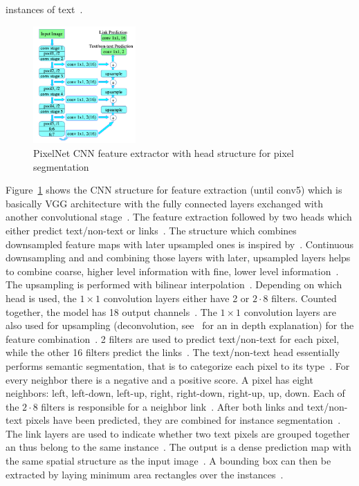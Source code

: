 instances of text~\citep{deng_pixellink_2018}.
\begin{figure}[ht]
    \centering
    \includegraphics[width=0.35\textwidth]{img/STD-seg-based-CNN-Deng-PixelLink-2018.png}
    \caption[Feature extractor and prediction head for pixel segmentation]{%
        PixelNet CNN feature extractor with head structure for pixel
        segmentation\label{fig:STD-segbased-pixel-CNN}
    }
\end{figure}
Figure~\ref{fig:STD-segbased-pixel-CNN} shows the \ac{CNN} structure for feature extraction
(until conv5) which is basically VGG architecture with the fully connected layers exchanged with
another convolutional stage~\citep{deng_pixellink_2018}.
The feature extraction followed by two heads which either predict text/non-text or
links~\citep{deng_pixellink_2018}.
The structure which combines downsampled feature maps with later upsampled ones is inspired
by~\cite{long_fully_2015}.
Continuous downsampling and and combining those layers with later, upsampled layers helps
to combine coarse, higher level information with fine, lower level
information~\citep{long_fully_2015}.
The upsampling is performed with bilinear interpolation~\citep{deng_pixellink_2018}.
Depending on which head is used, the $1\times1$ convolution layers either have 2 or $2\cdot8$ filters.
Counted together, the model has 18 output channels~\citep{deng_pixellink_2018}.
The $1\times1$ convolution layers are also used for upsampling (deconvolution,
see~\cite{noh_learning_2015,long_fully_2015} for an in depth explanation)
for the feature combination~\citep{deng_pixellink_2018}.
2 filters are used to predict text/non-text for each pixel, while the other 16 filters predict
the links~\citep{deng_pixellink_2018}.
The text/non-text head essentially performs semantic segmentation, that is to categorize each
pixel to its type~\citep{deng_pixellink_2018}.
For every neighbor there is a negative and a positive score.
A pixel has eight neighbors: left, left-down, left-up, right, right-down, right-up, up, down.
Each of the $2\cdot8$ filters is responsible for a neighbor link~\citep{deng_pixellink_2018}.
After both links and text/non-text pixels have been predicted, they are combined for instance
segmentation~\citep{deng_pixellink_2018}.
The link layers are used to indicate whether two text pixels are grouped together an thus belong to
the same instance~\citep{deng_pixellink_2018}.
The output is a dense prediction map with the same spatial structure as the input
image~\citep{deng_pixellink_2018}.
A bounding box can then be extracted by laying minimum area rectangles over the
instances~\citep{deng_pixellink_2018}.

